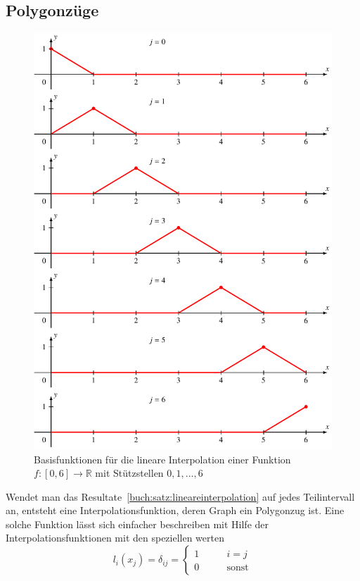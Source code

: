 \subsection{Polygonzüge
\label{buch:subsection:polygonzuege}}
\begin{figure}
\centering
\includegraphics{chapters/30-interpolation/figures/polygon.pdf}
\caption{Basisfunktionen für die lineare Interpolation einer 
Funktion $f\colon[0,6]\to\mathbb R$ mit Stützstellen $0,1,\dots,6$
\label{buch:figure:polygonbasis}}
\end{figure}
Wendet man das Resultate~\ref{buch:satz:lineareinterpolation} auf
jedes Teilintervall an, entsteht eine Interpolationsfunktion, deren
Graph ein Polygonzug ist.
Eine solche Funktion lässt sich einfacher beschreiben mit Hilfe
der Interpolationsfunktionen mit den speziellen werten
\begin{equation}
l_i(x_j) = \delta_{ij} =\begin{cases}
1&\qquad i=j\\
0&\qquad\text{sonst}
\end{cases}
\label{buch:eqn:interpolation:basis}
\end{equation}
